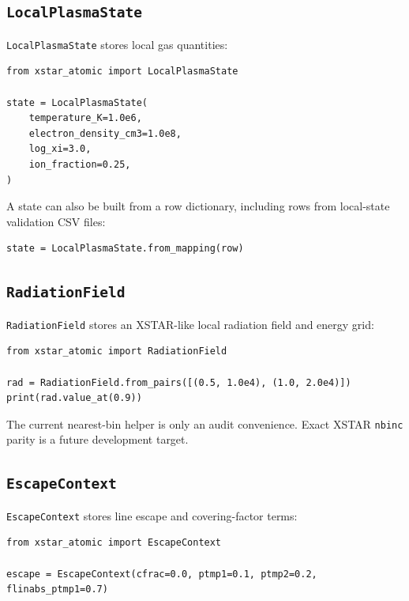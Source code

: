 \documentclass[11pt]{article}
\begin{document}
\subsection{\texttt{LocalPlasmaState}}

\texttt{LocalPlasmaState} stores local gas quantities:

\begin{lstlisting}[style=ctpython]
from xstar_atomic import LocalPlasmaState

state = LocalPlasmaState(
    temperature_K=1.0e6,
    electron_density_cm3=1.0e8,
    log_xi=3.0,
    ion_fraction=0.25,
)
\end{lstlisting}

A state can also be built from a row dictionary, including rows from local-state validation CSV files:

\begin{lstlisting}[style=ctpython]
state = LocalPlasmaState.from_mapping(row)
\end{lstlisting}

\subsection{\texttt{RadiationField}}

\texttt{RadiationField} stores an XSTAR-like local radiation field and energy grid:

\begin{lstlisting}[style=ctpython]
from xstar_atomic import RadiationField

rad = RadiationField.from_pairs([(0.5, 1.0e4), (1.0, 2.0e4)])
print(rad.value_at(0.9))
\end{lstlisting}

The current nearest-bin helper is only an audit convenience. Exact XSTAR \texttt{nbinc} parity is a future development target.

\subsection{\texttt{EscapeContext}}

\texttt{EscapeContext} stores line escape and covering-factor terms:

\begin{lstlisting}[style=ctpython]
from xstar_atomic import EscapeContext

escape = EscapeContext(cfrac=0.0, ptmp1=0.1, ptmp2=0.2, flinabs_ptmp1=0.7)
\end{lstlisting}
\end{document}
